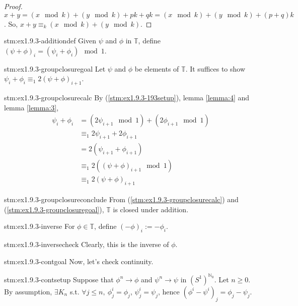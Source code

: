 \begin{proof}
$x + y = ( x \mod k ) + ( y \mod k ) + pk + qk = (x \mod k) + (y \mod k) + (p+q)k$. So, $x + y \equiv_k (x \mod k) + (y \mod k)$.
\end{proof}

\begin{statement}{stm:ex1.9.3-additiondef}
Given $\psi$ and $\phi$ in $\mathbb{T}$, define $(\psi + \phi)_i = (\psi_i + \phi_i) \mod 1$.
\end{statement}

\begin{statement}{stm:ex1.9.3-groupclosuregoal}
Let $\psi$ and $\phi$ be elements of $\mathbb{T}$. It suffices to show $\psi_i + \phi_i \equiv_1 2(\psi + \phi)_{i+1}$.
\end{statement}

\begin{statement}{stm:ex1.9.3-groupclosurecalc}
By (\ref{stm:ex1.9.3-193setup}), lemma \ref{lemma:4} and lemma \ref{lemma:3},
\begin{align*}
\psi_i + \phi_i &= (2\psi_{i+1} \mod 1) + (2\phi_{i+1} \mod 1) \\
&\equiv_1 2\psi_{i+1} + 2\phi_{i+1} \\
&= 2(\psi_{i+1} + \phi_{i+1}) \\
&\equiv_1 2((\psi + \phi)_{i+1} \mod 1) \\
&\equiv_1 2(\psi + \phi)_{i+1}
\end{align*}
\end{statement}

\begin{statement}{stm:ex1.9.3-groupclosureconclude}
From (\ref{stm:ex1.9.3-groupclosurecalc}) and (\ref{stm:ex1.9.3-groupclosuregoal}), $\mathbb{T}$ is closed under addition.
\end{statement}

\begin{statement}{stm:ex1.9.3-inverse}
For $\phi \in \mathbb{T}$, define $(-\phi)_i := -\phi_i$.
\end{statement}

\begin{statement}{stm:ex1.9.3-inversecheck}
Clearly, this is the inverse of $\phi$.
\end{statement}

\begin{explanation}{stm:ex1.9.3-contgoal}
Now, let's check continuity.
\end{explanation}

\begin{statement}{stm:ex1.9.3-contsetup}
Suppose that $\phi^n \to \phi$ and $\psi^n \to \psi$ in $(S^1)^{\mathbb{N}_0}$. Let $n \ge 0$. By assumption, $\exists K_n$ s.t. $\forall j \le n, \ \phi_j^i = \phi_j$, $\psi_j^i = \psi_j$, hence $(\phi^i - \psi^i)_j = \phi_j - \psi_j$.
\end{statement}

